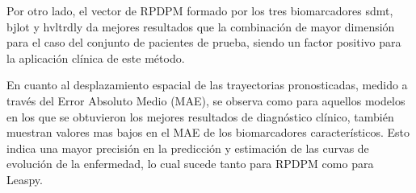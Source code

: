Por otro lado, el vector de RPDPM formado por los tres biomarcadores sdmt, bjlot y hvltrdly da mejores resultados que la combinación de mayor dimensión para el caso del conjunto de pacientes de prueba, siendo un factor positivo para la aplicación clínica de este método. 

En cuanto al desplazamiento espacial de las trayectorias pronosticadas, medido a través del Error Absoluto Medio (MAE), se observa como para aquellos modelos en los que se obtuvieron los mejores resultados de diagnóstico clínico, también muestran valores mas bajos en el MAE de los biomarcadores característicos. Esto indica una mayor precisión en la predicción y estimación de las curvas de evolución de la enfermedad, lo cual sucede tanto para RPDPM como para Leaspy.


